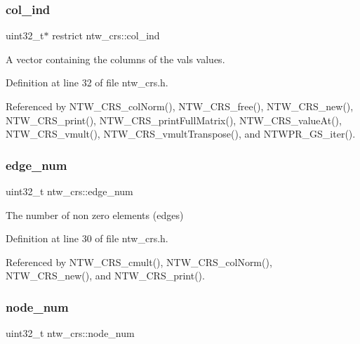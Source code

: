 \subsubsection{\texorpdfstring{col\+\_\+ind}{col\_ind}}
{\footnotesize\ttfamily uint32\+\_\+t$\ast$ restrict ntw\+\_\+crs\+::col\+\_\+ind}

A vector containing the columns of the val\textquotesingle{}s values. 

Definition at line 32 of file ntw\+\_\+crs.\+h.



Referenced by N\+T\+W\+\_\+\+C\+R\+S\+\_\+col\+Norm(), N\+T\+W\+\_\+\+C\+R\+S\+\_\+free(), N\+T\+W\+\_\+\+C\+R\+S\+\_\+new(), N\+T\+W\+\_\+\+C\+R\+S\+\_\+print(), N\+T\+W\+\_\+\+C\+R\+S\+\_\+print\+Full\+Matrix(), N\+T\+W\+\_\+\+C\+R\+S\+\_\+value\+At(), N\+T\+W\+\_\+\+C\+R\+S\+\_\+vmult(), N\+T\+W\+\_\+\+C\+R\+S\+\_\+vmult\+Transpose(), and N\+T\+W\+P\+R\+\_\+\+G\+S\+\_\+iter().

\mbox{\label{structntw__crs_a85160ebade6d93ba77c9e90f2f237cea}} 
\subsubsection{\texorpdfstring{edge\+\_\+num}{edge\_num}}
{\footnotesize\ttfamily uint32\+\_\+t ntw\+\_\+crs\+::edge\+\_\+num}

The number of non zero elements (edges) 

Definition at line 30 of file ntw\+\_\+crs.\+h.



Referenced by N\+T\+W\+\_\+\+C\+R\+S\+\_\+cmult(), N\+T\+W\+\_\+\+C\+R\+S\+\_\+col\+Norm(), N\+T\+W\+\_\+\+C\+R\+S\+\_\+new(), and N\+T\+W\+\_\+\+C\+R\+S\+\_\+print().

\mbox{\label{structntw__crs_a36a11fbae59bf6159e40cb18e5f37ada}} 
\subsubsection{\texorpdfstring{node\+\_\+num}{node\_num}}
{\footnotesize\ttfamily uint32\+\_\+t ntw\+\_\+crs\+::node\+\_\+num}

